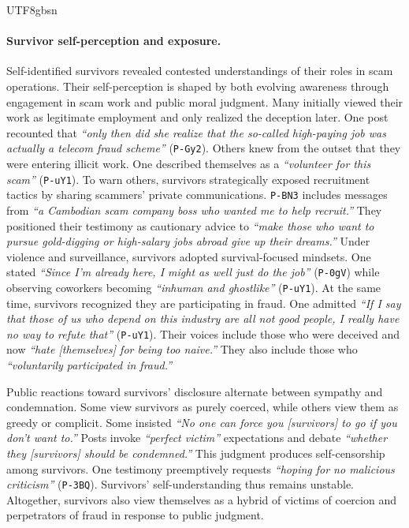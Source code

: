 \documentclass[sigconf,nonacm]{acmart}
\newcommand{\rev}[1]{#1}
\begin{document}
\begin{CJK}{UTF8}{gbsn}
\paragraph{\textbf{\rev{Survivor self-perception and exposure.}}}
\rev{Self-identified survivors revealed contested understandings of their roles in scam operations. Their self-perception is shaped by both evolving awareness through engagement in scam work and public moral judgment. Many initially viewed their work as legitimate employment and only realized the deception later. One post recounted that \textit{``only then did she realize that the so-called high-paying job was actually a telecom fraud scheme''} (\texttt{P-Gy2}). Others knew from the outset that they were entering illicit work. One described themselves as a \textit{``volunteer for this scam''} (\texttt{P-uY1}). To warn others, survivors strategically exposed recruitment tactics by sharing scammers' private communications. \texttt{P-BN3} includes messages from \textit{``a Cambodian scam company boss who wanted me to help recruit.''} They positioned their testimony as cautionary advice to \textit{``make those who want to pursue gold-digging or high-salary jobs abroad give up their dreams.''} Under violence and surveillance, survivors adopted survival-focused mindsets. One stated \textit{``Since I'm already here, I might as well just do the job''} (\texttt{P-0gV}) while observing coworkers becoming \textit{``inhuman and ghostlike''} (\texttt{P-uY1}). At the same time, survivors recognized they are participating in fraud. One admitted \textit{``If I say that those of us who depend on this industry are all not good people, I really have no way to refute that''} (\texttt{P-uY1}). Their voices include those who were deceived and now \textit{``hate [themselves] for being too naive.''} They also include those who \textit{``voluntarily participated in fraud.''}} 

Public reactions toward survivors' disclosure alternate between sympathy and condemnation. Some view survivors as purely coerced, while others view them as greedy or complicit. Some insisted \textit{``No one can force you [survivors] to go if you don't want to.''} Posts invoke \textit{``perfect victim''} expectations and debate \textit{``whether they [survivors] should be condemned.''} This judgment produces self-censorship among survivors. One testimony preemptively requests \textit{``hoping for no malicious criticism''} (\texttt{P-3BQ}). Survivors' self-understanding thus remains unstable. 
Altogether, survivors also view themselves as a hybrid of victims of coercion and perpetrators of fraud in response to public judgment.


\end{CJK}
\end{document}
